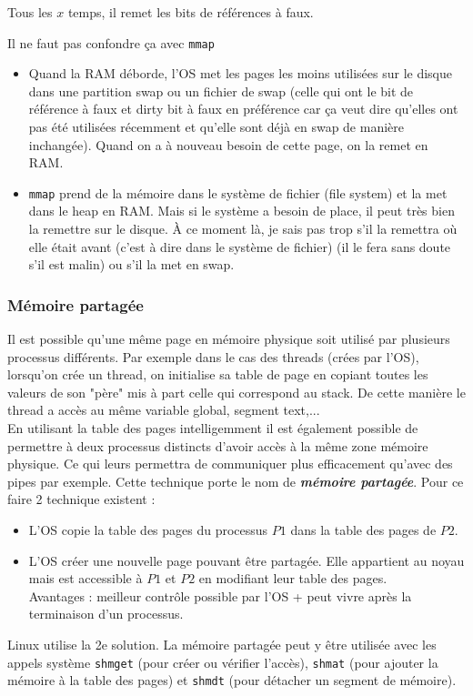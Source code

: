 Tous les $x$ temps, il remet les bits de références à faux.

Il ne faut pas confondre ça avec \lstinline{mmap}

\begin{itemize}
  \item Quand la RAM déborde,
    l'OS met les pages les moins utilisées sur le disque dans une partition
    swap ou un fichier de swap
    (celle qui ont le bit de référence à faux et dirty bit à faux
    en préférence car ça veut dire qu'elles ont pas été utilisées
    récemment et qu'elle sont déjà en swap de manière inchangée).
    Quand on a à nouveau besoin de cette page, on la remet en RAM.
  \item \lstinline{mmap} prend de la mémoire dans le
    système de fichier (file system)
    et la met dans le heap en RAM.
    Mais si le système a besoin de place,
    il peut très bien la remettre sur le disque.
    À ce moment là,
    je sais pas trop s'il la remettra où elle était avant
    (c'est à dire dans le système de fichier)
    (il le fera sans doute s'il est malin) ou s'il la met en swap.
\end{itemize}

\subsubsection{Mémoire partagée}
Il est possible qu'une même page en mémoire physique soit utilisé par plusieurs processus différents. Par exemple dans le cas des threads (crées par l'OS), lorsqu'on crée un thread, on initialise sa table de page en copiant toutes les valeurs de son "père" mis à part celle qui correspond au stack. De cette manière le thread a accès au même variable global, segment text,... \\

En utilisant la table des pages intelligemment il est également possible de permettre à deux processus distincts d'avoir accès à la même zone mémoire physique. Ce qui leurs permettra de communiquer plus efficacement qu'avec des pipes par exemple. Cette technique porte le nom de \textit{\textbf{mémoire partagée}}. Pour ce faire 2 technique existent :
\begin{itemize}
  \item L'OS copie la table des pages du processus $P1$ dans la table des pages de $P2$.
  \item L'OS créer une nouvelle page pouvant être partagée. Elle appartient au noyau mais est accessible à $P1$ et $P2$ en modifiant leur table des pages. \\
    Avantages : meilleur contrôle possible par l'OS + peut vivre après la terminaison d'un processus.
\end{itemize}
Linux utilise la 2e solution. La mémoire partagée peut y être utilisée avec les appels système \texttt{shmget} (pour créer ou vérifier l'accès), \texttt{shmat} (pour ajouter la mémoire à la table des pages) et \texttt{shmdt} (pour détacher un segment de mémoire).\\

